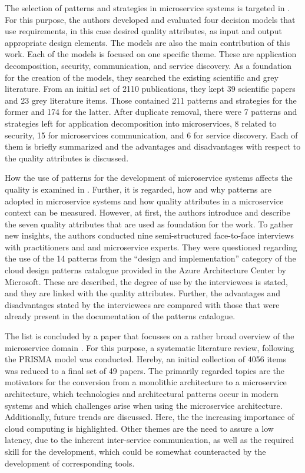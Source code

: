 \documentclass{bmcart}
\begin{document}
The selection of patterns and strategies in microservice systems is targeted in \cite{Waseem.2022}. For this purpose, the authors developed and evaluated four decision models that use requirements, in this case desired quality attributes, as input and output appropriate design elements. The models are also the main contribution of this work. Each of the models is focused on one specific theme. These are application decomposition, security, communication, and service discovery. As a foundation for the creation of the models, they searched the existing scientific and grey literature. From an initial set of 2110 publications, they kept 39 scientific papers and 23 grey literature items. Those contained 211 patterns and strategies for the former and 174 for the latter. After duplicate removal, there were 7 patterns and strategies left for application decomposition into microservices, 8 related to security, 15 for microservices communication, and 6 for service discovery. Each of them is briefly summarized and the advantages and disadvantages with respect to the quality attributes is discussed.

How the use of patterns for the development of microservice systems affects the quality is examined in \cite{Vale.2022}. Further, it is regarded, how and why patterns are adopted in microservice systems and how quality attributes in a microservice context can be measured. However, at first, the authors introduce and describe the seven quality attributes that are used as foundation for the work. To gather new insights, the authors conducted nine semi-structured face-to-face interviews with practitioners and and microservice experts. They were questioned regarding the use of the 14 patterns from the “design and implementation” category of the cloud design patterns catalogue \cite{AAC.2022} provided in the Azure Architecture Center by Microsoft. These are described, the degree of use by the interviewees is stated, and they are linked with the quality attributes. Further, the advantages and disadvantages stated by the interviewees are compared with those that were already present in the documentation of the patterns catalogue.

The list is concluded by a paper that focusses on a rather broad overview of the microservice domain \cite{Weerasinghe.2022}. For this purpose, a systematic literature review, following the PRISMA model \cite{Page.2021} was conducted. Hereby, an initial collection of 4056 items was reduced to a final set of 49 papers. The primarily regarded topics are the motivators for the conversion from a monolithic architecture to a microservice architecture, which technologies and architectural patterns occur in modern systems and which challenges arise when using the microservice architecture. Additionally, future trends are discussed. Here, the the increasing importance of cloud computing is highlighted. Other themes are the need to assure a low latency, due to the inherent inter-service communication, as well as the required skill for the development, which could be somewhat counteracted by the development of corresponding tools.
\end{document}

